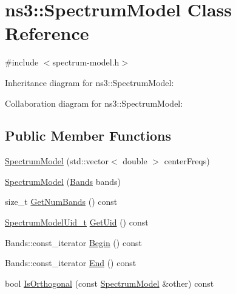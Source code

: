 \hypertarget{classns3_1_1SpectrumModel}{}\section{ns3\+:\+:Spectrum\+Model Class Reference}
\label{classns3_1_1SpectrumModel}


{\ttfamily \#include $<$spectrum-\/model.\+h$>$}



Inheritance diagram for ns3\+:\+:Spectrum\+Model\+:


Collaboration diagram for ns3\+:\+:Spectrum\+Model\+:
\subsection*{Public Member Functions}
\begin{DoxyCompactItemize}
\item 
\hyperlink{classns3_1_1SpectrumModel_a3edd5bc340da916c0c910096ccb8f8ca}{Spectrum\+Model} (std\+::vector$<$ double $>$ center\+Freqs)
\item 
\hyperlink{classns3_1_1SpectrumModel_ad6c1789816bf638f4679e9d523c47f3b}{Spectrum\+Model} (\hyperlink{namespacens3_a46ac9188e5cf43bd5292f7b67451246e}{Bands} bands)
\item 
size\+\_\+t \hyperlink{classns3_1_1SpectrumModel_a07c4a1c2f963885dd7fef7f82b20e90b}{Get\+Num\+Bands} () const 
\item 
\hyperlink{namespacens3_a5bf0e89b3407bbb59c90a4d8c4cf0a18}{Spectrum\+Model\+Uid\+\_\+t} \hyperlink{classns3_1_1SpectrumModel_ae1d40eba0d8e7af10e954381b4380ac1}{Get\+Uid} () const 
\item 
Bands\+::const\+\_\+iterator \hyperlink{classns3_1_1SpectrumModel_a41b34bec2d882bb573849dad7237b10d}{Begin} () const 
\item 
Bands\+::const\+\_\+iterator \hyperlink{classns3_1_1SpectrumModel_ac1c60822fc8fd0463905ac908df1e8b4}{End} () const 
\item 
bool \hyperlink{classns3_1_1SpectrumModel_a7580b1e7e983b1862227e9ce37fccdab}{Is\+Orthogonal} (const \hyperlink{classns3_1_1SpectrumModel}{Spectrum\+Model} \&other) const 
\end{DoxyCompactItemize}

